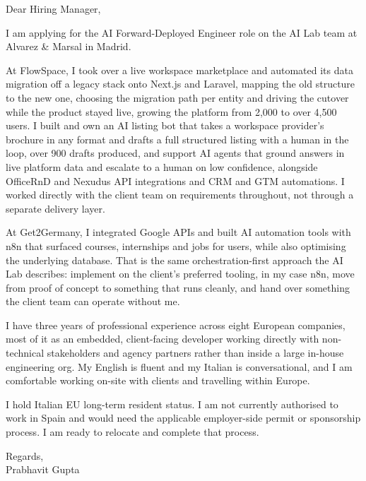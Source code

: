 \documentclass[a4paper,11pt]{article}
\begin{document}
Dear Hiring Manager,

I am applying for the AI Forward-Deployed Engineer role on the AI Lab team at Alvarez \& Marsal in Madrid.

At FlowSpace, I took over a live workspace marketplace and automated its data migration off a legacy stack onto Next.js and Laravel, mapping the old structure to the new one, choosing the migration path per entity and driving the cutover while the product stayed live, growing the platform from 2,000 to over 4,500 users. I built and own an AI listing bot that takes a workspace provider's brochure in any format and drafts a full structured listing with a human in the loop, over 900 drafts produced, and support AI agents that ground answers in live platform data and escalate to a human on low confidence, alongside OfficeRnD and Nexudus API integrations and CRM and GTM automations. I worked directly with the client team on requirements throughout, not through a separate delivery layer.

At Get2Germany, I integrated Google APIs and built AI automation tools with n8n that surfaced courses, internships and jobs for users, while also optimising the underlying database. That is the same orchestration-first approach the AI Lab describes: implement on the client's preferred tooling, in my case n8n, move from proof of concept to something that runs cleanly, and hand over something the client team can operate without me.

I have three years of professional experience across eight European companies, most of it as an embedded, client-facing developer working directly with non-technical stakeholders and agency partners rather than inside a large in-house engineering org. My English is fluent and my Italian is conversational, and I am comfortable working on-site with clients and travelling within Europe.

I hold Italian EU long-term resident status. I am not currently authorised to work in Spain and would need the applicable employer-side permit or sponsorship process. I am ready to relocate and complete that process.

Regards,\\
Prabhavit Gupta
\end{document}
